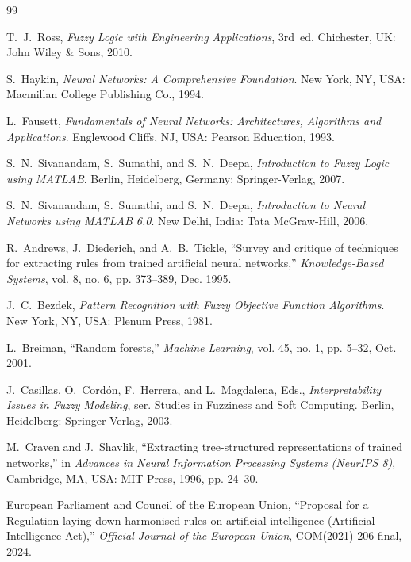 \documentclass[12pt,a4paper,oneside]{report}
\begin{document}
\begin{thebibliography}{99}

T.~J.~Ross, \emph{Fuzzy Logic with Engineering Applications}, 3rd~ed. Chichester, UK: John Wiley \& Sons, 2010.

S.~Haykin, \emph{Neural Networks: A Comprehensive Foundation}. New York, NY, USA: Macmillan College Publishing Co., 1994.

L.~Fausett, \emph{Fundamentals of Neural Networks: Architectures, Algorithms and Applications}. Englewood Cliffs, NJ, USA: Pearson Education, 1993.

S.~N.~Sivanandam, S.~Sumathi, and S.~N.~Deepa, \emph{Introduction to Fuzzy Logic using MATLAB}. Berlin, Heidelberg, Germany: Springer-Verlag, 2007.

S.~N.~Sivanandam, S.~Sumathi, and S.~N.~Deepa, \emph{Introduction to Neural Networks using MATLAB 6.0}. New Delhi, India: Tata McGraw-Hill, 2006.

R.~Andrews, J.~Diederich, and A.~B.~Tickle, ``Survey and critique of techniques for extracting rules from trained artificial neural networks,'' \emph{Knowledge-Based Systems}, vol. 8, no. 6, pp. 373--389, Dec. 1995.

J.~C.~Bezdek, \emph{Pattern Recognition with Fuzzy Objective Function Algorithms}. New York, NY, USA: Plenum Press, 1981.

L.~Breiman, ``Random forests,'' \emph{Machine Learning}, vol. 45, no. 1, pp. 5--32, Oct. 2001.

J.~Casillas, O.~Cord{\'o}n, F.~Herrera, and L.~Magdalena, Eds., \emph{Interpretability Issues in Fuzzy Modeling}, ser. Studies in Fuzziness and Soft Computing. Berlin, Heidelberg: Springer-Verlag, 2003.

M.~Craven and J.~Shavlik, ``Extracting tree-structured representations of trained networks,'' in \emph{Advances in Neural Information Processing Systems (NeurIPS 8)}, Cambridge, MA, USA: MIT Press, 1996, pp. 24--30.

European Parliament and Council of the European Union, ``Proposal for a Regulation laying down harmonised rules on artificial intelligence (Artificial Intelligence Act),'' \emph{Official Journal of the European Union}, COM(2021) 206 final, 2024.


\end{thebibliography}
\end{document}
